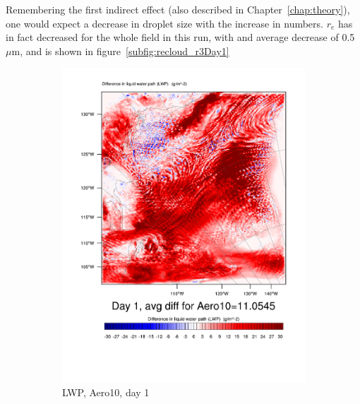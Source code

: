Remembering the first indirect effect (also described in Chapter~\ref{chap:theory}), one would expect a decrease in droplet size with the increase in numbers. $r_e$ has in fact decreased for the whole field in this run, with and average decrease of 0.5~$\mu\text{m}$, and is shown in figure~\ref{subfig:recloud_r3Day1}

\begin{figure}[hb]
\centering
	\begin{subfigure}{0.40\textwidth}
		\centering
		\includegraphics[width=\textwidth]{results/aero10/Diff_LWP_Day1Aero10.pdf}
		\caption{LWP, Aero10, day 1}
		\label{subfig:LWPr3Day1}
	\end{subfigure}
	\quad
	\begin{subfigure}{0.40\textwidth}
		\centering

\end{subfigure}
\end{figure}
